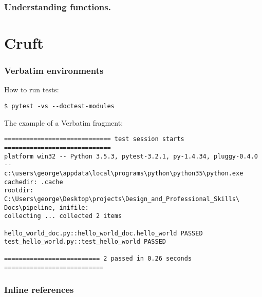 \documentclass{beamer} %
\begin{document}
\begin{frame}
\frametitle{Understanding functions.}
\end{frame}




\section{Cruft}

\begin{frame}[fragile]
\frametitle{Verbatim environments} 

How to run tests:
\begin{verbatim}
$ pytest -vs --doctest-modules
\end{verbatim}

\vspace{5mm}  

The example of a Verbatim fragment:
\scriptsize %
\begin{verbatim}
============================= test session starts =============================
platform win32 -- Python 3.5.3, pytest-3.2.1, py-1.4.34, pluggy-0.4.0 -- 
c:\users\george\appdata\local\programs\python\python35\python.exe
cachedir: .cache
rootdir: C:\Users\george\Desktop\projects\Design_and_Professional_Skills\
Docs\pipeline, inifile:
collecting ... collected 2 items

hello_world_doc.py::hello_world_doc.hello_world PASSED
test_hello_world.py::test_hello_world PASSED

========================== 2 passed in 0.26 seconds ===========================
\end{verbatim}

\end{frame}

\begin{frame}
\frametitle{Inline references}


\end{frame}


\end{document}
